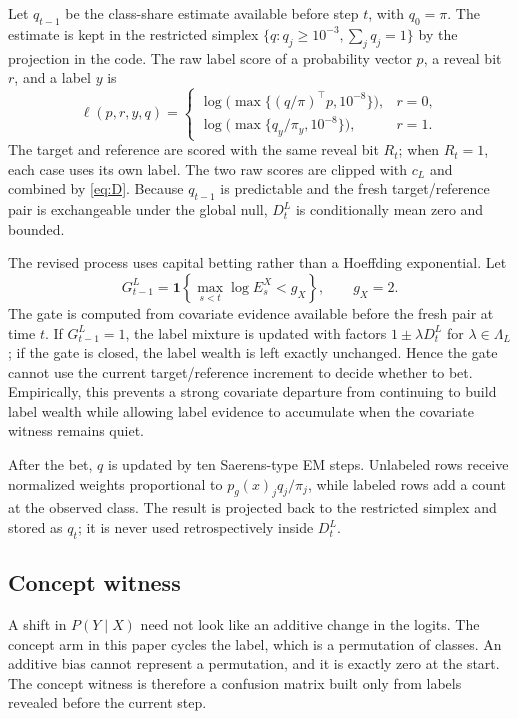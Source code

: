 \documentclass[11pt,a4paper]{article}
\theoremstyle{definition}
\newcommand{\1}{\mathbf{1}}
\begin{document}
Let $q_{t-1}$ be the class-share estimate available before step $t$, with $q_0=\pi$. The estimate is kept in the restricted simplex $\{q:q_j\ge10^{-3},\sum_jq_j=1\}$ by the projection in the code. The raw label score of a probability vector $p$, a reveal bit $r$, and a label $y$ is
\begin{equation}
\ell(p,r,y,q)=
\begin{cases}
\log\big(\max\{(q/\pi)^\top p,10^{-8}\}\big), & r=0,\\[4pt]
\log\big(\max\{q_y/\pi_y,10^{-8}\}\big), & r=1.
\end{cases}
\label{eq:label}
\end{equation}
The target and reference are scored with the same reveal bit $R_t$; when $R_t=1$, each case uses its own label. The two raw scores are clipped with $c_L$ and combined by \eqref{eq:D}. Because $q_{t-1}$ is predictable and the fresh target/reference pair is exchangeable under the global null, $D_t^L$ is conditionally mean zero and bounded.

The revised process uses capital betting rather than a Hoeffding exponential. Let
\[
G_{t-1}^L=\mathbf 1\!\left\{\max_{s<t}\log E_s^X<g_X\right\},\qquad g_X=2.
\]
The gate is computed from covariate evidence available before the fresh pair at time $t$. If $G_{t-1}^L=1$, the label mixture is updated with factors $1\pm\lambda D_t^L$ for $\lambda\in\Lambda_L$; if the gate is closed, the label wealth is left exactly unchanged. Hence the gate cannot use the current target/reference increment to decide whether to bet. Empirically, this prevents a strong covariate departure from continuing to build label wealth while allowing label evidence to accumulate when the covariate witness remains quiet.

After the bet, $q$ is updated by ten Saerens-type EM steps. Unlabeled rows receive normalized weights proportional to $p_g(x)_j q_j/\pi_j$, while labeled rows add a count at the observed class. The result is projected back to the restricted simplex and stored as $q_t$; it is never used retrospectively inside $D_t^L$.

\subsection{Concept witness}

A shift in \(P(Y\mid X)\) need not look like an additive change in the logits. The concept arm in this paper cycles the label, which is a permutation of classes. An additive bias cannot represent a permutation, and it is exactly zero at the start. The concept witness is therefore a confusion matrix built only from labels revealed before the current step.
\end{document}

